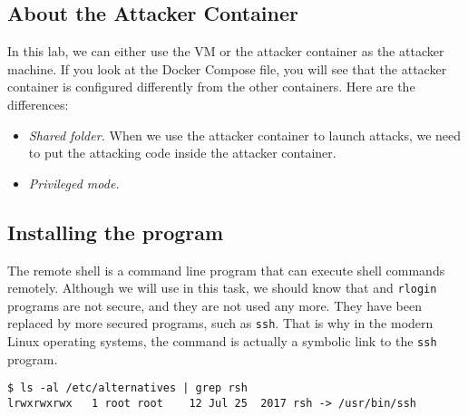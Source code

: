



\subsection{About the Attacker Container}

In this lab, we can either use the VM or the attacker container
as the attacker machine. If you look at the Docker Compose file, you will
see that the attacker container is configured differently from the other
containers. Here are the differences:

\begin{itemize}
\item \textit{Shared folder.} When we use the attacker container
to launch attacks, we need to put the attacking code inside
the attacker container.


\item \textit{Privileged mode.}


\end{itemize}








\subsection{Installing the \rsh program}

The remote shell \rsh is a command line program that can execute shell commands
remotely. Although we will use \rsh in this task, we should know that 
\rsh and \texttt{rlogin} programs are not secure, and they 
are not used any more. They have been replaced by
more secured programs, such as \texttt{ssh}.   
That is why in the modern Linux operating systems, the \rsh command 
is actually a symbolic link to the \texttt{ssh} program. 

\begin{lstlisting}
$ ls -al /etc/alternatives | grep rsh
lrwxrwxrwx   1 root root    12 Jul 25  2017 rsh -> /usr/bin/ssh
\end{lstlisting}



